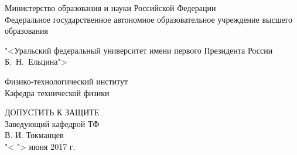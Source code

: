 \begin{titlepage}
\begin{center}

	\begin{normalsize}
		{
			\noindent Министерство образования и науки Российской Федерации\\
			\noindent Федеральное государственное автономное образовательное учреждение высшего образования\\
		}
	\end{normalsize}
	
	\par \vspace{0.2cm}

	{

		\noindent "<Уральский федеральный университет имени первого Президента России Б.~Н.~Ельцина">\\
	}
	\noindent Физико-технологический институт \\
	\noindent Кафедра технической физики \\

	\par \vspace{1cm}

	\hfill\begin{minipage}{.45\textwidth}
		\begin{large}
			\begin{raggedleft}
				ДОПУСТИТЬ К ЗАЩИТЕ\\
				Заведующий кафедрой ТФ \\
				\underline{\hspace{2cm}} В. И. Токманцев \\
				"< \underline{\hspace{1cm}} "> июня 2017 г. \\
			\end{raggedleft}
		\end{large}
	\end{minipage}


\end{center}
\end{titlepage}

